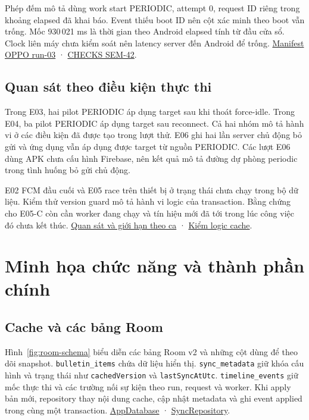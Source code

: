 \documentclass[12pt,a4paper]{report}
\newcommand{\repo}{https://github.com/ThanhTris/Seminar-IE307/blob/db8dc5f}
\newcommand{\source}[2]{\href{\repo/#1}{#2}}
\begin{document}
Phép đếm mô tả dùng work start PERIODIC, attempt 0, request ID riêng trong khoảng elapsed đã khai báo. Event thiếu boot ID nên cột xác minh theo boot vẫn trống. Mốc 930\,021 ms là thời gian theo Android elapsed tính từ đầu cửa sổ. Clock liên máy chưa kiểm soát nên latency server đến Android để trống. \source{experiments/pilots/run-sem42-oppo-e01-03/manifest.json}{Manifest OPPO run-03} · \source{docs/evidence/SEM-42/CHECKS.md}{CHECKS SEM-42}.

\subsection{Quan sát theo điều kiện thực thi}
Trong E03, hai pilot PERIODIC áp dụng target sau khi thoát force-idle. Trong E04, ba pilot PERIODIC áp dụng target sau reconnect. Cả hai nhóm mô tả hành vi ở các điều kiện đã được tạo trong lượt thử. E06 ghi hai lần server chủ động bỏ gửi và ứng dụng vẫn áp dụng được target từ nguồn PERIODIC. Các lượt E06 dùng APK chưa cấu hình Firebase, nên kết quả mô tả đường dự phòng periodic trong tình huống bỏ gửi chủ động.

E02 FCM đầu cuối và E05 race trên thiết bị ở trạng thái chưa chạy trong bộ dữ liệu. Kiểm thử version guard mô tả hành vi logic của transaction. Bằng chứng cho E05-C còn cần worker đang chạy và tín hiệu mới đã tới trong lúc công việc đó chưa kết thúc. \source{experiments/SUMMARY.md}{Quan sát và giới hạn theo ca} · \source{docs/evidence/SEM-39/CORE_CASES.md}{Kiểm logic cache}.

\section{Minh họa chức năng và thành phần chính}
\label{sec:architecture}
\subsection{Cache và các bảng Room}
Hình~\ref{fig:room-schema} biểu diễn các bảng Room v2 và những cột dùng để theo dõi snapshot. \texttt{bulletin\_items} chứa dữ liệu hiển thị. \texttt{sync\_metadata} giữ khóa cấu hình và trạng thái như \texttt{cachedVersion} và \texttt{lastSyncAtUtc}. \texttt{timeline\_events} giữ mốc thực thi và các trường nối sự kiện theo run, request và worker. Khi apply bản mới, repository thay nội dung cache, cập nhật metadata và ghi event applied trong cùng một transaction. \source{android/app/src/main/java/com/thanhtris/seminarie307/data/local/AppDatabase.kt}{AppDatabase} · \source{android/app/src/main/java/com/thanhtris/seminarie307/sync/SyncRepository.kt}{SyncRepository}.
\end{document}

